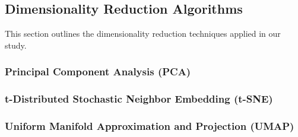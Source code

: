 \subsection{Dimensionality Reduction Algorithms}
\label{subsec:methods-reduction}

This section outlines the dimensionality reduction techniques applied in our study.


\subsubsection{Principal Component Analysis (PCA)}

\subsubsection{t-Distributed Stochastic Neighbor Embedding (t-SNE)}

\subsubsection{Uniform Manifold Approximation and Projection (UMAP)}

